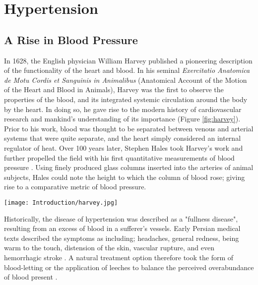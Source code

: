 \doublespacing
\section{Hypertension}

\subsection{A Rise in Blood Pressure}

In 1628, the English physician William Harvey published a pioneering description of the functionality of the heart and blood. In his seminal \textit{Exercitatio Anatomica de Motu Cordis et Sanguinis in Animalibus} (Anatomical Account of the Motion of the Heart and Blood in Animals), Harvey was the first to observe the properties of the blood, and its integrated systemic circulation around the body by the heart. In doing so, he gave rise to the modern history of cardiovascular research and mankind's understanding of its importance (Figure \ref{fig:harvey}). Prior to his work, blood was thought to be separated between venous and arterial systems that were quite separate, and the heart simply considered an internal regulator of heat. Over 100 years later, Stephen Hales took Harvey's work and further propelled the field with his first quantitative measurements of blood pressure \cite{hales}. Using finely produced glass columns inserted into the arteries of animal subjects, Hales could note the height to which the column of blood rose; giving rise to a comparative metric of blood pressure. \\

\begin{figure*}[!htbp]
\centering
\texttt{[image: Introduction/harvey.jpg]}
\caption[An illustration from an experiment in Harvey's \textit{De Motu Cordis}]{A drawing taken from Harvey's \textit{Exercitatio Anatomica de Motu Cordis et Sanguinis in Animalibus} depicting an experiment on valves in the venous circulatory system.}
\label{fig:harvey}
\end{figure*}

Historically, the disease of hypertension was described as a "fullness disease", resulting from an excess of blood in a sufferer's vessels. Early Persian medical texts described the symptoms as including; headaches, general redness, being warm to the touch, distension of the skin, vascular rupture, and even hemorrhagic stroke \cite{Heydari2014}. A natural treatment option therefore took the form of blood-letting or the application of leeches to balance the perceived overabundance of blood present \cite{Esunge1991}. 

